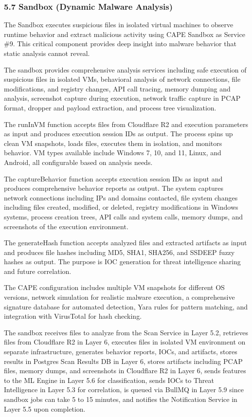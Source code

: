 \documentclass[12pt,a4paper]{report}
\begin{document}
\subsubsection{5.7 Sandbox (Dynamic Malware Analysis)}

The Sandbox executes suspicious files in isolated virtual machines to observe runtime behavior and extract malicious activity using CAPE Sandbox as Service \#9. This critical component provides deep insight into malware behavior that static analysis cannot reveal.

The sandbox provides comprehensive analysis services including safe execution of suspicious files in isolated VMs, behavioral analysis of network connections, file modifications, and registry changes, API call tracing, memory dumping and analysis, screenshot capture during execution, network traffic capture in PCAP format, dropper and payload extraction, and process tree visualization.

The runInVM function accepts files from Cloudflare R2 and execution parameters as input and produces execution session IDs as output. The process spins up clean VM snapshots, loads files, executes them in isolation, and monitors behavior. VM types available include Windows 7, 10, and 11, Linux, and Android, all configurable based on analysis needs.

The captureBehavior function accepts execution session IDs as input and produces comprehensive behavior reports as output. The system captures network connections including IPs and domains contacted, file system changes including files created, modified, or deleted, registry modifications in Windows systems, process creation trees, API calls and system calls, memory dumps, and screenshots of the execution environment.

The generateHash function accepts analyzed files and extracted artifacts as input and produces file hashes including MD5, SHA1, SHA256, and SSDEEP fuzzy hashes as output. The purpose is IOC generation for threat intelligence sharing and future correlation.

The CAPE configuration includes multiple VM snapshots for different OS versions, network simulation for realistic malware execution, a comprehensive signature database for automated detection, Yara rules for pattern matching, and integration with VirusTotal for hash checking.

The sandbox receives files to analyze from the Scan Service in Layer 5.2, retrieves files from Cloudflare R2 in Layer 6, executes files in isolated VM environment on separate infrastructure, generates behavior reports, IOCs, and artifacts, stores results in Postgres Scan Results DB in Layer 6, stores artifacts including PCAP files, memory dumps, and screenshots in Cloudflare R2 in Layer 6, sends features to the ML Engine in Layer 5.6 for classification, sends IOCs to Threat Intelligence in Layer 5.3 for correlation, is queued via BullMQ in Layer 5.9 since sandbox jobs can take 5 to 15 minutes, and notifies the Notification Service in Layer 5.5 upon completion.
\end{document}
